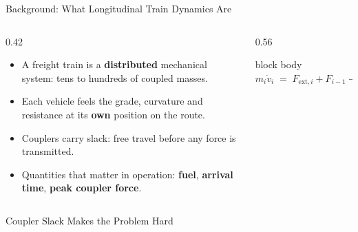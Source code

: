 \begin{frame}{Background: What Longitudinal Train Dynamics Are}
  \begin{columns}[T,onlytextwidth]
    \begin{column}{0.42\textwidth}
      \begin{itemize}\setlength\itemsep{0.6em}
        \item A freight train is a \textbf{distributed} mechanical system:
              tens to hundreds of coupled masses.
        \item Each vehicle feels the grade, curvature and resistance
              at its \textbf{own} position on the route.
        \item Couplers carry \alert{slack}: free travel before any force
              is transmitted.
        \item Quantities that matter in operation: \textbf{fuel},
              \textbf{arrival time}, \textbf{peak coupler force}.
      \end{itemize}
    \end{column}
    \begin{column}{0.56\textwidth}
      \centering
      \vspace{0.6em}
      \scalebox{0.70}{\trainFBD}

      \vspace{1.8em}
      \begin{beamercolorbox}[wd=0.92\textwidth,sep=6pt,center]{block body}
        $m_i\dot v_i \;=\; F_{\mathrm{ext},i} + F_{i-1} - F_i$
      \end{beamercolorbox}
    \end{column}
  \end{columns}
\end{frame}

\begin{frame}{Coupler Slack Makes the Problem Hard}
  \centering

  \vspace{0.3em}
\end{frame}

